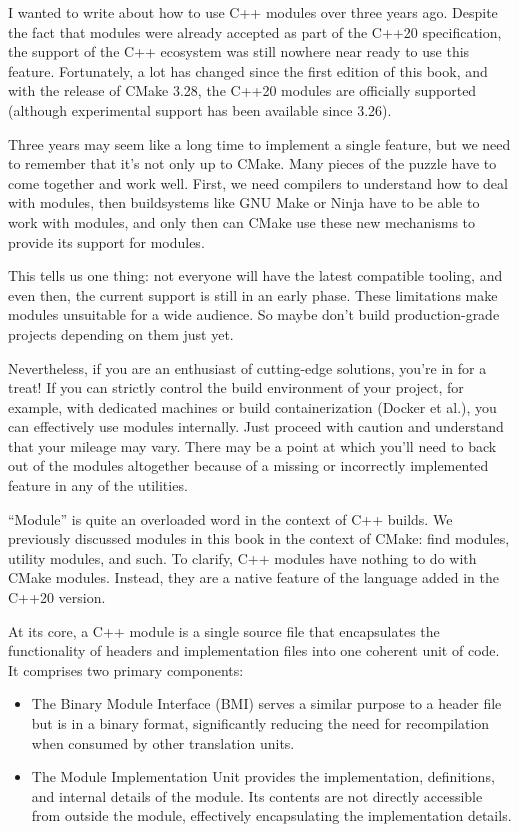 I wanted to write about how to use C++ modules over three years ago. Despite the fact that modules were already accepted as part of the C++20 specification, the support of the C++ ecosystem was still nowhere near ready to use this feature. Fortunately, a lot has changed since the first edition of this book, and with the release of CMake 3.28, the C++20 modules are officially supported (although experimental support has been available since 3.26).

Three years may seem like a long time to implement a single feature, but we need to remember that it’s not only up to CMake. Many pieces of the puzzle have to come together and work well. First, we need compilers to understand how to deal with modules, then buildsystems like GNU Make or Ninja have to be able to work with modules, and only then can CMake use these new mechanisms to provide its support for modules.

This tells us one thing: not everyone will have the latest compatible tooling, and even then, the current support is still in an early phase. These limitations make modules unsuitable for a wide audience. So maybe don’t build production-grade projects depending on them just yet.

Nevertheless, if you are an enthusiast of cutting-edge solutions, you’re in for a treat! If you can strictly control the build environment of your project, for example, with dedicated machines or build containerization (Docker et al.), you can effectively use modules internally. Just proceed with caution and understand that your mileage may vary. There may be a point at which you’ll need to back out of the modules altogether because of a missing or incorrectly implemented feature in any of the utilities.

“Module” is quite an overloaded word in the context of C++ builds. We previously discussed modules in this book in the context of CMake: find modules, utility modules, and such. To clarify, C++ modules have nothing to do with CMake modules. Instead, they are a native feature of the language added in the C++20 version.

At its core, a C++ module is a single source file that encapsulates the functionality of headers and implementation files into one coherent unit of code. It comprises two primary components:

\begin{itemize}
\item
The Binary Module Interface (BMI) serves a similar purpose to a header file but is in a binary format, significantly reducing the need for recompilation when consumed by other translation units.

\item
The Module Implementation Unit provides the implementation, definitions, and internal details of the module. Its contents are not directly accessible from outside the module, effectively encapsulating the implementation details.
\end{itemize}

